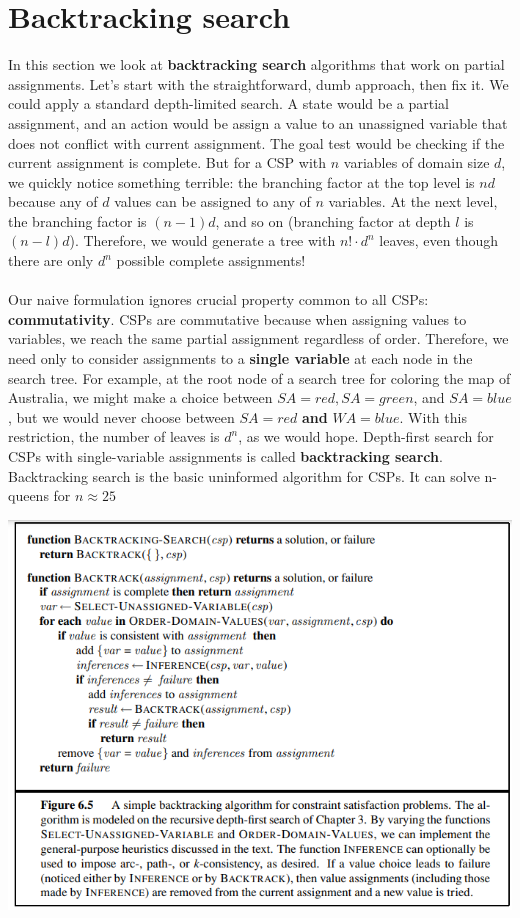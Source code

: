 \section{Backtracking search}
In this section we look at \textbf{backtracking search} algorithms that work on partial assignments. Let’s start with the straightforward, dumb approach, then fix it. We could apply a standard depth-limited search. A state would be a partial assignment, and an action would be assign a value to an unassigned variable that does not conflict with current assignment. The goal test would be checking if the current assignment is complete. But for a CSP with $n$ variables of domain size $d$, we quickly notice something terrible:  the branching factor at the top level is $nd$ because any of $d$ values can be assigned to any of $n$ variables. At
the next level, the branching factor is $(n - 1)d$, and so on (branching factor at depth $l$ is $(n-l)d$). Therefore, we would generate a tree with $n! \cdot d^n$ leaves, even though there are only $d^n$ possible complete assignments!\\\\
Our naive formulation ignores crucial property common to all CSPs: \textbf{commutativity}.  CSPs are commutative because when assigning values to variables, we reach the same partial assignment regardless of order. Therefore, we
need only to consider assignments to a \textbf{single variable} at each node in the search tree. For example, at the root node of a search tree for coloring the map of Australia, we might make a choice between $SA = red, SA = green$, and $SA = blue$,  but we would never choose between $SA = red$ \textbf{and} $WA = blue$. With this restriction, the number of leaves is $d^n$, as we would hope. Depth-first search for CSPs with single-variable assignments is called \textbf{backtracking search}. Backtracking search is the basic uninformed algorithm for CSPs. It can solve n-queens for $n \approx 25$
\begin{center}
    \includegraphics[scale=0.8]{images/CSP-backtracking.png}
\end{center}
